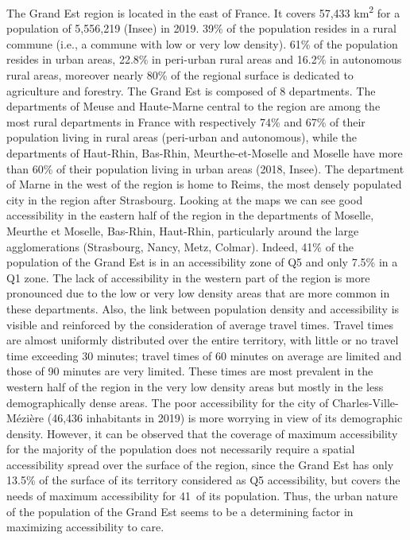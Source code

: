 The Grand Est region is located in the east of France. It covers 57,433
km\textsuperscript{2} for a population of 5,556,219 (Insee) in 2019. 39\% of the
population resides in a rural commune (i.e., a commune with low or very low
density). 61\% of the population resides in urban areas, 22.8\% in peri-urban
rural areas and 16.2\% in autonomous rural areas, moreover nearly 80\% of the
regional surface is dedicated to agriculture and forestry. The Grand Est is
composed of 8 departments. The departments of Meuse and Haute-Marne central to
the region are among the most rural departments in France with respectively 74\%
and 67\% of their population living in rural areas (peri-urban and autonomous),
while the departments of Haut-Rhin, Bas-Rhin, Meurthe-et-Moselle and Moselle
have more than 60\% of their population living in urban areas (2018, Insee). The
department of Marne in the west of the region is home to Reims, the most densely
populated city in the region after Strasbourg. Looking at the maps we can see
good accessibility in the eastern half of the region in the departments of
Moselle, Meurthe et Moselle, Bas-Rhin, Haut-Rhin, particularly around the large
agglomerations (Strasbourg, Nancy, Metz, Colmar). Indeed, 41\% of the population
of the Grand Est is in an accessibility zone of Q5 and only 7.5\% in
a Q1 zone. The lack of accessibility in the western part of the region is more
pronounced due to the low or very low density areas that are more common in
these departments. Also, the link between population density and accessibility
is visible and reinforced by the consideration of average travel times. Travel
times are almost uniformly distributed over the entire territory, with little or
no travel time exceeding 30 minutes; travel times of 60 minutes on average are
limited and those of 90 minutes are very limited. These times are most prevalent
in the western half of the region in the very low density areas but mostly in
the less demographically dense areas.  The poor accessibility for the city of
Charles-Ville-Mézière (46,436 inhabitants in 2019) is more worrying in view of
its demographic density. However, it can be observed that the coverage of
maximum accessibility for the majority of the population does not necessarily
require a spatial accessibility spread over the surface of the region, since the
Grand Est has only 13.5\% of the surface of its territory considered as Q5
accessibility, but covers the needs of maximum accessibility for 41\ of its
population. Thus, the urban nature of the population of the Grand Est seems to
be a determining factor in maximizing accessibility to care.

